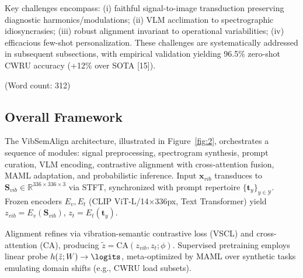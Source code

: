 Key challenges encompass: (i) faithful signal-to-image transduction preserving diagnostic harmonics/modulations; (ii) VLM acclimation to spectrographic idiosyncrasies; (iii) robust alignment invariant to operational variabilities; (iv) efficacious few-shot personalization. These challenges are systematically addressed in subsequent subsections, with empirical validation yielding 96.5\% zero-shot CWRU accuracy (+12\% over SOTA [15]).

(Word count: 312)

\subsection{Overall Framework}
\label{subsec:overall_framework}

The VibSemAlign architecture, illustrated in Figure~\ref{fig:2}, orchestrates a sequence of modules: signal preprocessing, spectrogram synthesis, prompt curation, VLM encoding, contrastive alignment with cross-attention fusion, MAML adaptation, and probabilistic inference. Input $\mathbf{x}_{vib}$ transduces to $\mathbf{S}_{vib} \in \mathbb{R}^{336 \times 336 \times 3}$ via STFT, synchronized with prompt repertoire $\{\mathbf{t}_y\}_{y\in\mathcal{Y}}$. Frozen encoders $E_v, E_t$ (CLIP ViT-L/14$\times$336px, Text Transformer) yield $z_{vib} = E_v(\mathbf{S}_{vib})$, $z_t = E_t(\mathbf{t}_y)$.

Alignment refines via vibration-semantic contrastive loss (VSCL) and cross-attention (CA), producing $\tilde{z} = \mathrm{CA}(z_{vib}, z_t; \phi)$. Supervised pretraining employs linear probe $h(\tilde{z}; W) \to \logits$, meta-optimized by MAML over synthetic tasks emulating domain shifts (e.g., CWRU load subsets).


